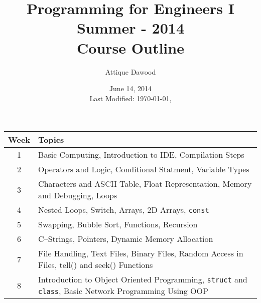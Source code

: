 \documentclass[12pt,a4paper]{article}
\title{Programming for Engineers I\\Summer - 2014\\Course Outline}
\author{Attique Dawood}
\date{June 14, 2014\\[0.2cm] Last Modified: \today, \currenttime}
\begin{document}
\maketitle
\begin{table}[H]
\begin{center}
\vspace{-0.3cm}
	\begin{tabular}{|c|p{10cm}|}
	\hline \hline
		\rule{0pt}{2.6ex} \textbf{Week} & \textbf{Topics}\\
		\hline
		1\rule{0pt}{2.6ex} & Basic Computing, Introduction to IDE, Compilation Steps\\
		2 & Operators and Logic, Conditional Statment, Variable Types\\
		3 & Characters and ASCII Table, Float Representation, Memory and Debugging, Loops\\
		4 & Nested Loops, Switch, Arrays, 2D Arrays, \texttt{const}\\
		5 & Swapping, Bubble Sort, Functions, Recursion\\
		6 & C--Strings, Pointers, Dynamic Memory Allocation\\
		7 & File Handling, Text Files, Binary Files, Random Access in Files, tell() and seek() Functions\\
		8 & Introduction to Object Oriented Programming, \texttt{struct} and \texttt{class}, Basic Network Programming Using OOP\\
	\hline \hline
	\end{tabular}
\end{center}
\label{Programming-I-Course-Outline}
\end{table}
\end{document}
